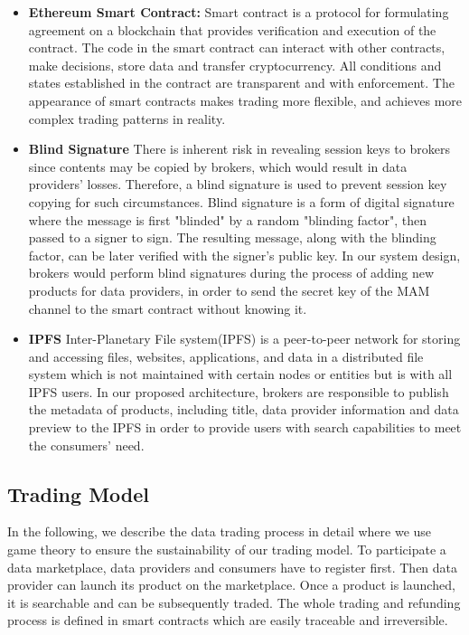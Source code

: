 \documentclass[journal,article,submit,moreauthors,pdftex]{Definitions/mdpi}
\begin{document}
\begin{itemize}[leftmargin=*,labelsep=5.8mm]
\item \textbf{Ethereum Smart Contract: }
Smart contract is a protocol for formulating agreement on a blockchain that provides verification and execution of the contract. The code in the smart contract can interact with other contracts, make decisions, store data and transfer cryptocurrency. All conditions and states established in the contract are transparent and with enforcement. The appearance of smart contracts makes trading more flexible, and achieves more complex trading patterns in reality.

\item \textbf{Blind Signature}
There is inherent risk in revealing session keys to brokers since contents may be copied by brokers, which would result in data providers' losses. Therefore, a blind signature is used to prevent session key copying for such circumstances. Blind signature\cite{blindSig} is a form of digital signature where the message is first "blinded" by a random "blinding factor", then passed to a signer to sign. The resulting message, along with the blinding factor, can be later verified with the signer's public key. In our system design, brokers would perform blind signatures during the process of adding new products for data providers, in order to send the secret key of the MAM channel to the smart contract without knowing it.

\item \textbf{IPFS}
Inter-Planetary File system(IPFS)\cite{IPFS} is a peer-to-peer network for storing and accessing files, websites, applications, and data in a distributed file system which is not maintained with certain nodes or entities but is with all IPFS users. In our proposed architecture, brokers are responsible to publish the metadata of products, including title, data provider information and data preview to the IPFS in order to provide users with search capabilities to meet the consumers' need.
\end{itemize}

\subsection{Trading Model}
In the following, we describe the data trading process in detail where we use game theory to ensure the sustainability of our trading model. To participate a data marketplace, data providers and consumers have to register first. Then data provider can launch its product on the marketplace. Once a product is launched, it is searchable and can be subsequently traded. The whole trading and refunding process is defined in smart contracts which are easily traceable and irreversible.
\end{document}
